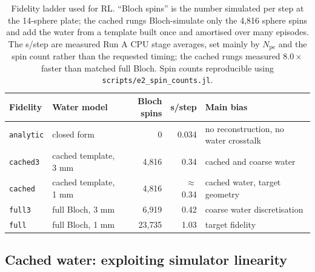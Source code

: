 \begin{table}[!htbp]
\centering
\small
\setlength{\tabcolsep}{4pt}
\renewcommand{\arraystretch}{0.92}
\begin{tabular}{llrrl}
\toprule
Fidelity & Water model & Bloch spins & s/step & Main bias \\
\midrule
\texttt{analytic} & closed form & 0 & 0.034 & no reconstruction, no water crosstalk \\
\texttt{cached3} & cached template, 3 mm & 4{,}816 & 0.34 & cached and coarse water \\
\texttt{cached} & cached template, 1 mm & 4{,}816 & ${\approx}$0.34 & cached water, target geometry \\
\texttt{full3} & full Bloch, 3 mm & 6{,}919 & 0.42 & coarse water discretisation \\
\texttt{full} & full Bloch, 1 mm & 23{,}735 & 1.03 & target fidelity \\
\bottomrule
\end{tabular}
\caption{Fidelity ladder used for RL. ``Bloch spins'' is the number simulated
per step at the 14-sphere plate; the cached rungs Bloch-simulate only the
4{,}816 sphere spins and add the water from a template built once and amortised
over many episodes. The s/step are measured Run A CPU stage averages, set mainly
by $N_\mathrm{pe}$ and the spin count rather than the requested timing; the
cached rungs measured $8.0\times$ faster than matched full Bloch. Spin counts
reproducible using \texttt{scripts/e2\_spin\_counts.jl}.}
\label{tab:e2-fidelity-ladder}
\end{table}

\subsection{Cached water: exploiting simulator linearity}
\label{sec:e2-water-cache}

